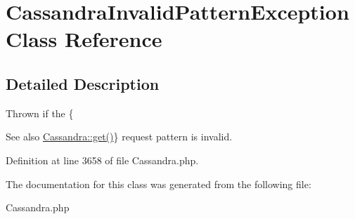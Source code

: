 \hypertarget{classCassandraInvalidPatternException}{
\section{CassandraInvalidPatternException Class Reference}
\label{classCassandraInvalidPatternException}
}


\subsection{Detailed Description}
Thrown if the \{\begin{DoxySeeAlso}{See also}
\hyperlink{classCassandra_ad2f8866d598ac0f696cb0c87258133fb}{Cassandra::get()}\} request pattern is invalid. 
\end{DoxySeeAlso}


Definition at line 3658 of file Cassandra.php.



The documentation for this class was generated from the following file:\begin{DoxyCompactItemize}
\item 
Cassandra.php\end{DoxyCompactItemize}
